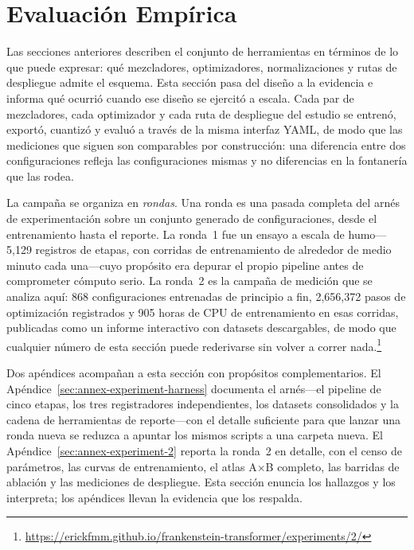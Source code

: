 \section{Evaluación Empírica}
\label{sec:empirical-evaluation}

Las secciones anteriores describen el conjunto de herramientas en términos de lo que puede expresar: qué mezcladores, optimizadores, normalizaciones y rutas de despliegue admite el esquema. Esta sección pasa del diseño a la evidencia e informa qué ocurrió cuando ese diseño se ejercitó a escala. Cada par de mezcladores, cada optimizador y cada ruta de despliegue del estudio se entrenó, exportó, cuantizó y evaluó a través de la misma interfaz YAML, de modo que las mediciones que siguen son comparables por construcción: una diferencia entre dos configuraciones refleja las configuraciones mismas y no diferencias en la fontanería que las rodea.

La campaña se organiza en \emph{rondas}. Una ronda es una pasada completa del arnés de experimentación sobre un conjunto generado de configuraciones, desde el entrenamiento hasta el reporte. La ronda~1 fue un ensayo a escala de humo---5{,}129 registros de etapas, con corridas de entrenamiento de alrededor de medio minuto cada una---cuyo propósito era depurar el propio pipeline antes de comprometer cómputo serio. La ronda~2 es la campaña de medición que se analiza aquí: 868 configuraciones entrenadas de principio a fin, 2{,}656{,}372 pasos de optimización registrados y 905 horas de CPU de entrenamiento en esas corridas, publicadas como un informe interactivo con datasets descargables, de modo que cualquier número de esta sección puede rederivarse sin volver a correr nada.\footnote{\url{https://erickfmm.github.io/frankenstein-transformer/experiments/2/}}

Dos apéndices acompañan a esta sección con propósitos complementarios. El Apéndice~\ref{sec:annex-experiment-harness} documenta el arnés---el pipeline de cinco etapas, los tres registradores independientes, los datasets consolidados y la cadena de herramientas de reporte---con el detalle suficiente para que lanzar una ronda nueva se reduzca a apuntar los mismos scripts a una carpeta nueva. El Apéndice~\ref{sec:annex-experiment-2} reporta la ronda~2 en detalle, con el censo de parámetros, las curvas de entrenamiento, el atlas A$\times$B completo, las barridas de ablación y las mediciones de despliegue. Esta sección enuncia los hallazgos y los interpreta; los apéndices llevan la evidencia que los respalda.

